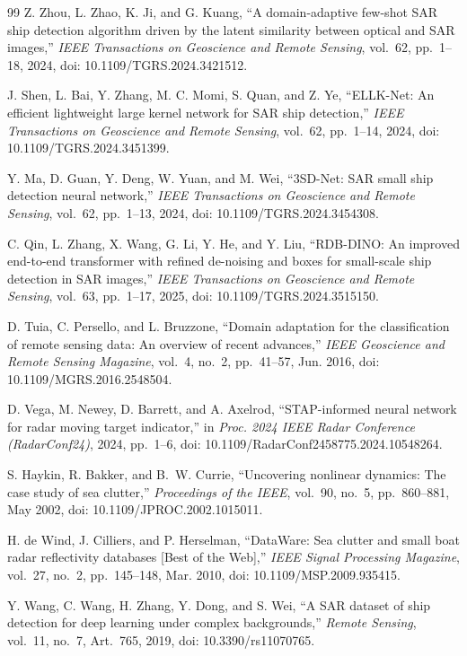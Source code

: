 \documentclass[journal]{IEEEtran}
\begin{document}
\begin{thebibliography}{99}
Z. Zhou, L. Zhao, K. Ji, and G. Kuang, ``A domain-adaptive few-shot SAR ship detection algorithm driven by the latent similarity between optical and SAR images,'' \emph{IEEE Transactions on Geoscience and Remote Sensing}, vol.~62, pp.~1--18, 2024, doi: 10.1109/TGRS.2024.3421512.

J. Shen, L. Bai, Y. Zhang, M. C. Momi, S. Quan, and Z. Ye, ``ELLK-Net: An efficient lightweight large kernel network for SAR ship detection,'' \emph{IEEE Transactions on Geoscience and Remote Sensing}, vol.~62, pp.~1--14, 2024, doi: 10.1109/TGRS.2024.3451399.

Y. Ma, D. Guan, Y. Deng, W. Yuan, and M. Wei, ``3SD-Net: SAR small ship detection neural network,'' \emph{IEEE Transactions on Geoscience and Remote Sensing}, vol.~62, pp.~1--13, 2024, doi: 10.1109/TGRS.2024.3454308.

C. Qin, L. Zhang, X. Wang, G. Li, Y. He, and Y. Liu, ``RDB-DINO: An improved end-to-end transformer with refined de-noising and boxes for small-scale ship detection in SAR images,'' \emph{IEEE Transactions on Geoscience and Remote Sensing}, vol.~63, pp.~1--17, 2025, doi: 10.1109/TGRS.2024.3515150.

D. Tuia, C. Persello, and L. Bruzzone, ``Domain adaptation for the classification of remote sensing data: An overview of recent advances,'' \emph{IEEE Geoscience and Remote Sensing Magazine}, vol.~4, no.~2, pp.~41--57, Jun. 2016, doi: 10.1109/MGRS.2016.2548504.

D. Vega, M. Newey, D. Barrett, and A. Axelrod, ``STAP-informed neural network for radar moving target indicator,'' in \emph{Proc. 2024 IEEE Radar Conference (RadarConf24)}, 2024, pp.~1--6, doi: 10.1109/RadarConf2458775.2024.10548264.

S. Haykin, R. Bakker, and B.~W. Currie, ``Uncovering nonlinear dynamics: The case study of sea clutter,'' \emph{Proceedings of the IEEE}, vol.~90, no.~5, pp.~860--881, May 2002, doi: 10.1109/JPROC.2002.1015011.

H. de Wind, J. Cilliers, and P. Herselman, ``DataWare: Sea clutter and small boat radar reflectivity databases [Best of the Web],'' \emph{IEEE Signal Processing Magazine}, vol.~27, no.~2, pp.~145--148, Mar. 2010, doi: 10.1109/MSP.2009.935415.

Y. Wang, C. Wang, H. Zhang, Y. Dong, and S. Wei, ``A SAR dataset of ship detection for deep learning under complex backgrounds,'' \emph{Remote Sensing}, vol.~11, no.~7, Art.~765, 2019, doi: 10.3390/rs11070765.


\end{thebibliography}
\end{document}
